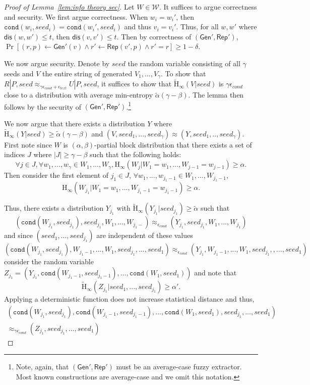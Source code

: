 \documentclass[11pt]{article}
\newcommand{\lemref}[1]{\mbox{Lemma~\ref{#1}}}
\newcommand{\class}[1]{{\ensuremath{\mathsf{#1}}}}
\newcommand{\gen}{\ensuremath{\class{Gen}}\xspace}
\newcommand{\rep}{\ensuremath{\class{Rep}}\xspace}
\newcommand{\dis}{\ensuremath{\mathsf{dis}}}
\newcommand{\Hoo}{\mathrm{H}_\infty}
\newcommand{\Hav}{\tilde{\mathrm{H}}_\infty}
\newcommand{\ext}{\ensuremath{\mathtt{ext}}}
\newcommand{\cond}{\ensuremath{\mathtt{cond}}}
\begin{document}
\begin{proof}[Proof of \lemref{lem:info theory sec}]
Let $W\in \mathcal{W}$.
It suffices to argue correctness and security.  We first argue correctness.  
When $w_i = w_i'$, then $\cond(w_i , seed_i) = \cond(w_i', seed_i)$ and thus $v_i = v_i'$.  Thus, for all $w, w'$ where $\dis(w, w')\le t$, then $\dis (v, v')\le t$.  Then by correctness of $(\gen', \rep')$, $\Pr[(r, p)\leftarrow \gen'(v) \wedge r'\leftarrow \rep(v',p) \wedge r' = r]\ge 1-\delta$.  

We now argue security.  Denote by $seed$ the random variable consisting of all $\gamma$ seeds and $V$ the entire string of generated $V_1,..., V_\gamma$.  To show that $R | P, seed \approx_{\gamma \epsilon_{cond} + \epsilon_{text}} U | P, seed$, it suffices to show that $\Hav(V | seed)$ is $\gamma \epsilon_{cond}$ close to a distribution with average min-entropy $\tilde{\alpha}(\gamma - \beta)$.  The lemma then follows by the security of $(\gen', \rep')$.\footnote{Note, again, that $(\gen', \rep')$ must be an average-case fuzzy extractor.  Most known constructions are average-case and we omit this notation.}

We now argue that there exists a distribution $Y$ where $\Hav(Y | seed)\ge \tilde{\alpha}(\gamma - \beta)$ and $(V, seed_1,..., seed_\gamma)\approx (Y, seed_1,.., seed_\gamma)$.  First note since $W$ is $(\alpha, \beta)$-partial block distribution that
there exists a set of indices $J$ where $|J| \geq \gamma - \beta$ such that the following holds:
\[
\forall j\in J, \forall w_1,..., w_\gamma \in W_1,..., W_\gamma, \Hoo(W_j | W_1 = w_1,..., W_{j-1}=w_{j-1}) \geq \alpha.
\]
Then consider the first element of $j_1\in J$, $\forall w_1,..., w_{j_1-1}\in W_1,..., W_{j_1-1}$, 
\[\Hoo(W_{j_1} | W_1 = w_1,..., W_{j_1-1} = w_{j_1-1})\ge \alpha.\]
 
\noindent 
Thus, there exists a distribution $Y_{j_1}$ with $\Hav(Y_{j_1} | seed_{j_1}) \ge \tilde{\alpha}$ such that 
\[(\cond (W_{j_1}, seed_{j_1}), seed_{j_1}, W_1,..., W_{j_1-}) \approx_{\epsilon_{cond}} (Y_{j_1}, seed_{j_1}, W_1,..., W_{j_1})\]
and since $(seed_1,..., seed_{j_1})$ are independent of these values
\[(\cond (W_{j_1},seed_{j_1}), W_{j_1-1},..., W_1, seed_{j_1}, ..., seed_{1}) \approx_{\epsilon_{cond}} (Y_{j_1}, W_{j_1-1},..., W_1, seed_{j_1}, , ...,  seed_{1})\]
consider the random variable $Z_{j_1} =( Y_{j_1}, \cond(W_{j_1-1},seed_{j_1-1}),..., \cond(W_{1}, seed_{1}))$ and note that \[\Hav(Z_{j_1} | seed_1,...,seed_{j_1})\ge \alpha'.\]
Applying a deterministic function does not increase statistical distance and thus,
\begin{align*}
(\cond (W_{j_1}, seed_{j_1}), \cond(W_{j_1-1}, seed_{j_1-1}),..., \cond(W_1, seed_1), seed_{j_1},..., seed_{1}) \\\approx_{\gamma \epsilon_{cond}} (Z_{j_1}, seed_{j_1},..., seed_1)
\end{align*}


\end{proof}
\end{document}
